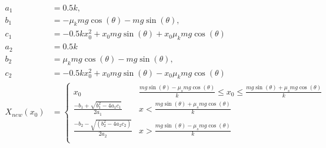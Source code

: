 \documentclass{article}
\begin{document}
\begin{align*}
a_1 & = 0.5 k, \\
b_1 & = - \mu_k mg \cos(\theta) - mg \sin(\theta), \\
c_1 & = -0.5 k x_0^2 + x_0 mg \sin(\theta) + x_0 \mu_k mg \cos(\theta) \\
a_2 & = 0.5 k \\
b_2 & = \mu_k mg \cos(\theta) - mg \sin(\theta), \\
c_2 & = -0.5 k x_0^2 + x_0 mg \sin(\theta) - x_0 \mu_k mg \cos(\theta) \\
X_{new}(x_0) & = 
    \begin{cases}
        x_0 & \frac{mg \sin(\theta) - \mu_s mg \cos(\theta)}{k} \le x_0 \le \frac{mg \sin(\theta) + \mu_s mg \cos(\theta)}{k} \\
    \frac{-b_1 + \sqrt{b_1^2 - 4a_1c_1}}{2a_1} & x < \frac{mg \sin(\theta) + \mu_s mg \cos(\theta)}{k} \\
        \frac{-b_2 - \sqrt{(b_2^2 - 4a_2c_2)}}{2a_2} & x > \frac{mg \sin(\theta) - \mu_s mg \cos(\theta)}{k} \\
    \end{cases}
\end{align*}
\end{document}
